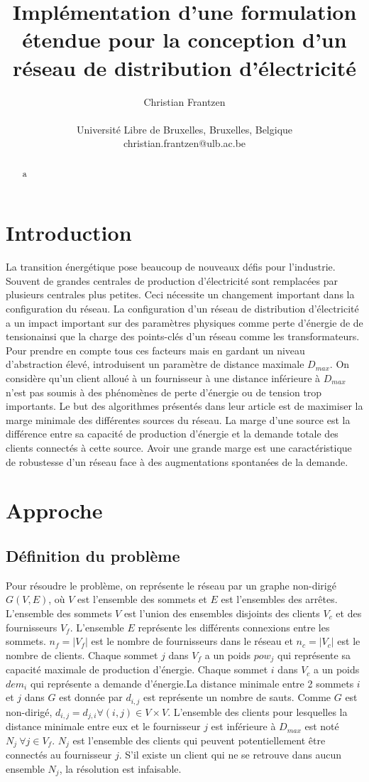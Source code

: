 \documentclass[letterpaper]{article}
\title{Implémentation d'une formulation étendue pour la conception d'un réseau de distribution d'électricité}
\author{Christian Frantzen \\
\mbox{}\\
Université Libre de Bruxelles, Bruxelles, Belgique \\
christian.frantzen@ulb.ac.be}
\begin{document}
\maketitle
\begin{abstract}
a
\end{abstract}
\section{Introduction}
La transition énergétique pose beaucoup de nouveaux défis pour l'industrie. Souvent de grandes centrales de production d'électricité sont remplacées par plusieurs centrales plus petites. Ceci nécessite un changement important dans la configuration du réseau. La configuration d'un réseau de distribution d'électricité a un impact important sur des paramètres physiques comme perte d'énergie de de tensionainsi que la charge des points-clés d'un réseau comme les transformateurs. Pour prendre en compte tous ces facteurs mais en gardant un niveau d'abstraction élevé, \citep*{Rossi} introduisent un paramètre de distance maximale $D_{max}$. On considère qu'un client alloué à un fournisseur à une distance inférieure à $D_{max}$ n'est pas soumis à des phénomènes de perte d'énergie ou de tension trop importants.\newline \indent
Le but des algorithmes présentés dans leur article est de maximiser la marge minimale des différentes sources du réseau. La marge d'une source est la différence entre sa capacité de production d'énergie et la demande totale des clients connectés à cette source.\newline \indent
Avoir une grande marge est une caractéristique de robustesse d'un réseau face à des augmentations spontanées de la demande.
\section{Approche}
\subsection{Définition du problème}
Pour résoudre le problème, on représente le réseau par un graphe non-dirigé $G(V,E)$, où $V$ est l'ensemble des sommets et $E$ est l'ensembles des arrêtes. L'ensemble des sommets $V$ est l'union des ensembles disjoints des clients  $V_{c}$ et des fournisseurs $V_{f}$. L'ensemble $E$ représente les différents connexions entre les sommets. $n_{f}=|V_{f}| $ est le nombre de fournisseurs dans le réseau et $n_{c}=|V_{c}| $ est le nombre de clients. Chaque sommet $j$ dans $V_{f}$ a un poids $pow_{j}$ qui représente sa capacité maximale de production d'énergie. Chaque sommet $i$ dans $V_{c}$ a un poids $dem_{i}$ qui représente a demande d'énergie.La distance minimale entre 2 sommets $i$ et $j$ dans $G$ est donnée par $d_{i,j}$ est représente un nombre de sauts. Comme $G$ est non-dirigé, $d_{i,j}=d_{j,i} \forall (i,j) \in V \times V$. L'ensemble des clients pour lesquelles la distance minimale entre eux et le fournisseur $j$ est inférieure à $D_{max}$ est noté $N_{j}\ \forall j \in V_{f}$. $N_{j}$ est l'ensemble des clients qui peuvent potentiellement être connectés au fournisseur $j$. S'il existe un client qui ne se retrouve dans aucun ensemble $N_{j}$, la résolution est infaisable.
\end{document}
